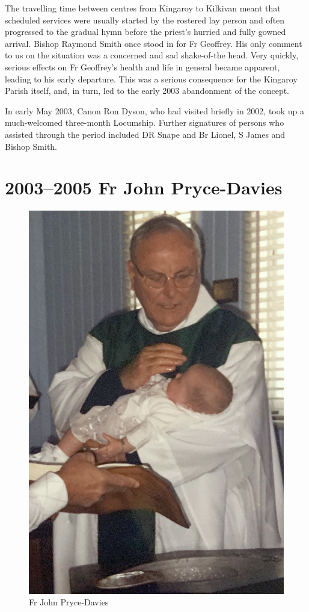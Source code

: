The travelling time between centres from Kingaroy to Kilkivan meant that scheduled services were usually started by the rostered lay person and often progressed to the gradual hymn before the priest's hurried and fully gowned arrival. Bishop Raymond Smith once stood in for Fr Geoffrey. His only comment to us on the situation was a concerned and sad shake-of-the head. Very quickly, serious effects on Fr Geoffrey's health and life in general became apparent, leading to his early departure. This was a serious consequence for the Kingaroy Parish itself, and, in turn, led to the early 2003 abandonment of the concept.



In early May 2003, Canon Ron Dyson, who had visited briefly in 2002, took up a much-welcomed three-month Locumship. Further signatures of persons who assisted through the period included DR Snape and Br Lionel, S James and Bishop Smith.



\section{2003--2005 Fr John Pryce-Davies}









\begin{figure}
\begin{center}
\includegraphics[width=.8\linewidth,center]{../images/JohnPryceDaviesWessling.jpg}
\caption{Fr John Pryce-Davies}
\end{center}
\end{figure}




